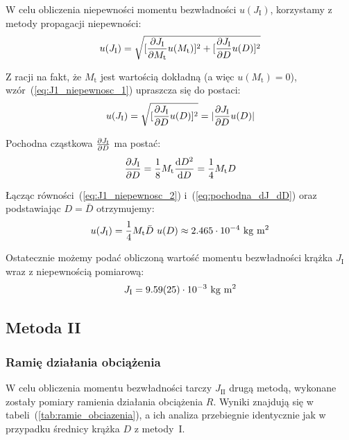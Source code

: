 \documentclass[twocolumn, a4paper, polish, 10pt]{article}
\begin{document}
W celu obliczenia niepewności momentu bezwładności $u(J_{\mathrm{I}})$, korzystamy z metody propagacji niepewności:
\begin{equation}
    u(J_{\mathrm{I}}) = \sqrt{ [ \pdv{J_{\mathrm{I}}}{M_{\mathrm{t}}} u(M_{\mathrm{t}}) ]^2 + [ \pdv{J_{\mathrm{I}}}{D} u(D) ]^2 } \\
\label{eq:J1_niepewnosc_1}
\end{equation}

Z racji na fakt, że $M_{\mathrm{t}}$ jest wartością dokładną (a więc $u(M_{\mathrm{t}}) = 0$), wzór~(\ref{eq:J1_niepewnosc_1}) upraszcza się do postaci:
\begin{equation}
    u(J_{\mathrm{I}}) = \sqrt{ [ \pdv{J_{\mathrm{I}}}{D} u(D) ]^2 } = |\pdv{J_{\mathrm{I}}}{D} u(D)| \\
\label{eq:J1_niepewnosc_2}
\end{equation}

Pochodna cząstkowa $\pdv{J_{\mathrm{I}}}{D}$ ma postać:
\begin{equation}
    \pdv{J_{\mathrm{I}}}{D} = \frac{1}{8} M_{\mathrm{t}} \dv{D^2}{D} = \frac{1}{4} M_{\mathrm{t}} D \\
\label{eq:pochodna_dJ_dD}
\end{equation}

Łącząc równości~(\ref{eq:J1_niepewnosc_2}) i~(\ref{eq:pochodna_dJ_dD}) oraz podstawiając $D=\bar{D}$ otrzymujemy:
\begin{displaymath}
    u(J_{\mathrm{I}}) = \frac{1}{4} M_{\mathrm{t}} \bar{D}~u(D) \approx 2.465 \cdot 10^{-4}~\mathrm{kg~m^2} \\
\end{displaymath}

Ostatecznie możemy podać obliczoną wartość momentu bezwładności krążka $J_{\mathrm{I}}$ wraz z niepewnością pomiarową:
\begin{displaymath}
    J_{\mathrm{I}} = 9.59(25) \cdot 10^{-3}~\mathrm{kg~m^2} \\
\end{displaymath}

\subsection{Metoda II}
\subsubsection{Ramię działania obciążenia}
W celu obliczenia momentu bezwładności tarczy $J_{\mathrm{II}}$ drugą metodą, wykonane zostały pomiary ramienia działania obciążenia $R$. Wyniki znajdują się w tabeli~(\ref{tab:ramie_obciazenia}), a ich analiza przebiegnie identycznie jak w przypadku średnicy krążka $D$ z metody~I.
\end{document}
